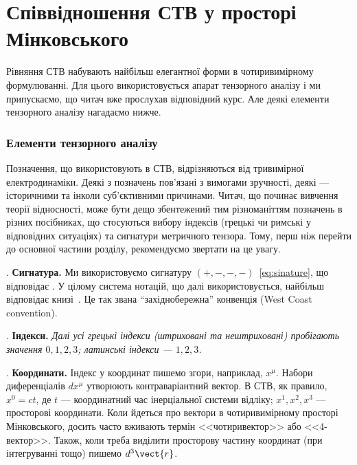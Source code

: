 

\chapter{Співвідношення СТВ у просторі Мінковського}\label{\currfilebase}

Рівняння СТВ набувають найбільш елегантної форми в чотиривимірному формулюванні. Для цього використовується апарат
тензорного аналізу і ми припускаємо, що читач вже прослухав відповідний курс. Але деякі елементи тензорного аналізу
нагадаємо нижче.

\subsection*{Елементи тензорного аналізу}

Позначення, що використовують в СТВ, відрізняються від тривимірної електродинаміки. Деякі з позначень пов'язані з
вимогами зручності, деякі --- історичними та інколи суб'єктивними причинами. Читач, що починає вивчення теорії
відносності, може бути дещо збентежений тим різноманіттям позначень в різних посібниках, що стосуються вибору індексів
(грецькі чи римські у відповідних ситуаціях) та сигнатури метричного тензора. Тому, перш ніж перейти до основної частини
розділу, рекомендуємо звертати на це увагу.

\newcommand{\element}{\textbf{\theelements}}

\element. \textbf{Сигнатура.} Ми використовуємо сигнатуру $(+,-,-,-)$~\eqref{eq:sinature}, що відповідає \cite{LandauLifshitz2003,bogoliubov1980introduction}. У цілому система нотацій, що далі  використовується, найбільш відповідає книзі~\cite{gusynin2023vstup}. Це так звана \enquote{західнобережна} конвенція (West Coast convention).

\element. \textbf{Індекси.} \textit{Далі усі грецькі індекси (штриховані та нештриховані) пробігають значення $0,1,2,3$;
латинські індекси --- $1,2,3$.}

\element. \textbf{Координати.} Індекс у координат пишемо згори, наприклад, $x^\mu$. Набори диференціалів $dx^\mu$
утворюють контраваріантний вектор. В СТВ, як правило, $x^0 = ct$, де $t$ --- координатний час інерціальної системи
відліку; $x^1, x^2, x^3$ --- просторові координати. Коли йдеться про вектори в чотиривимірному просторі Мінковського,
досить часто вживають термін <<чотиривектор>> або <<4-вектор>>. Також, коли треба виділити просторову частину координат
(при інтегруванні тощо) пишемо $d^3\vect{r}$.

